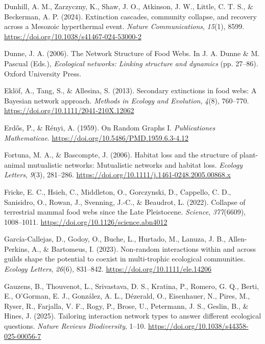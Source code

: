 \documentclass[
]{article}
\newlength{\cslhangindent}
\newenvironment{CSLReferences}[2] %
 {\begin{list}{}{%
  \setlength{\itemindent}{0pt}
  \setlength{\leftmargin}{0pt}
  \setlength{\parsep}{0pt}
  \ifodd #1
   \setlength{\leftmargin}{\cslhangindent}
   \setlength{\itemindent}{-1\cslhangindent}
  \fi
  \setlength{\itemsep}{#2\baselineskip}}}
 {\end{list}}
\begin{document}
\begin{CSLReferences}{1}{0}
Dunhill, A. M., Zarzyczny, K., Shaw, J. O., Atkinson, J. W., Little, C.
T. S., \& Beckerman, A. P. (2024). Extinction cascades, community
collapse, and recovery across a {Mesozoic} hyperthermal event.
\emph{Nature Communications}, \emph{15}(1), 8599.
\url{https://doi.org/10.1038/s41467-024-53000-2}

Dunne, J. A. (2006). The {Network Structure} of {Food Webs}. In J. A.
Dunne \& M. Pascual (Eds.), \emph{Ecological networks: {Linking}
structure and dynamics} (pp. 27--86). Oxford University Press.

Eklöf, A., Tang, S., \& Allesina, S. (2013). Secondary extinctions in
food webs: A {Bayesian} network approach. \emph{Methods in Ecology and
Evolution}, \emph{4}(8), 760--770.
\url{https://doi.org/10.1111/2041-210X.12062}

Erdős, P., \& Rényi, A. (1959). On {Random Graphs I}.
\emph{Publicationes Mathematicae}.
\url{https://doi.org/10.5486/PMD.1959.6.3-4.12}

Fortuna, M. A., \& Bascompte, J. (2006). Habitat loss and the structure
of plant-animal mutualistic networks: {Mutualistic} networks and habitat
loss. \emph{Ecology Letters}, \emph{9}(3), 281--286.
\url{https://doi.org/10.1111/j.1461-0248.2005.00868.x}

Fricke, E. C., Hsieh, C., Middleton, O., Gorczynski, D., Cappello, C.
D., Sanisidro, O., Rowan, J., Svenning, J.-C., \& Beaudrot, L. (2022).
Collapse of terrestrial mammal food webs since the {Late Pleistocene}.
\emph{Science}, \emph{377}(6609), 1008--1011.
\url{https://doi.org/10.1126/science.abn4012}

García-Callejas, D., Godoy, O., Buche, L., Hurtado, M., Lanuza, J. B.,
Allen-Perkins, A., \& Bartomeus, I. (2023). Non-random interactions
within and across guilds shape the potential to coexist in multi-trophic
ecological communities. \emph{Ecology Letters}, \emph{26}(6), 831--842.
\url{https://doi.org/10.1111/ele.14206}

Gauzens, B., Thouvenot, L., Srivastava, D. S., Kratina, P., Romero, G.
Q., Berti, E., O'Gorman, E. J., González, A. L., Dézerald, O.,
Eisenhauer, N., Pires, M., Ryser, R., Farjalla, V. F., Rogy, P., Brose,
U., Petermann, J. S., Geslin, B., \& Hines, J. (2025). Tailoring
interaction network types to answer different ecological questions.
\emph{Nature Reviews Biodiversity}, 1--10.
\url{https://doi.org/10.1038/s44358-025-00056-7}


\end{CSLReferences}
\end{document}
